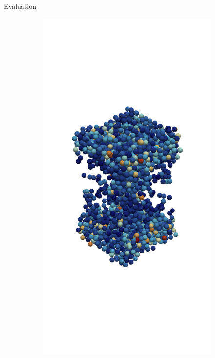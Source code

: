 \begin{frame}[c]{Evaluation}{}
{\begin{figure}[htpb]
\begin{subfigure}[c]{.2\textwidth}
				\vspace{-2cm}
			\end{subfigure}%
			\begin{subfigure}[c]{.2\textwidth}
				\includegraphics[width=\textwidth]{exploding-liquid/render/t3000.png}

\end{subfigure}
\end{figure}}
\end{frame}
